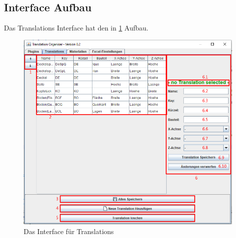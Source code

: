\documentclass{book}
\begin{document}
			\subsection{Interface Aufbau}
				Das Translations Interface hat den in \hyperref[fig:translations normal]{\ref{fig:translations normal}} Aufbau.
				\begin{figure}
					\centering
					\includegraphics[scale=0.48]{pics/assisttool/translations-normal.png}
					\caption{Das Interface für Translations}
					\label{fig:translations normal}
				\end{figure}
\end{document}
